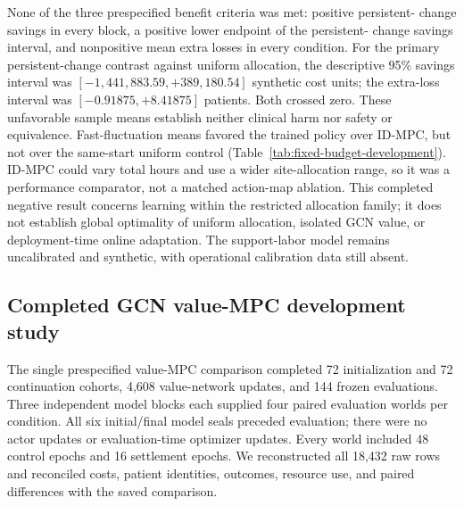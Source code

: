\documentclass[preprint,review,12pt]{elsarticle}
\begin{document}
None of the three prespecified benefit criteria was met: positive persistent-
change savings in every block, a positive lower endpoint of the persistent-
change savings interval, and nonpositive mean extra losses in every condition.
For the primary persistent-change contrast against uniform allocation,
the descriptive 95\% savings interval was
$[-1{,}441{,}883.59,+389{,}180.54]$ synthetic cost units; the extra-loss interval
was $[-0.91875,+8.41875]$ patients. Both crossed zero. These unfavorable sample
means establish neither clinical harm nor safety or equivalence.
Fast-fluctuation means favored the trained policy over ID-MPC, but not over
the same-start uniform control (Table~\ref{tab:fixed-budget-development}).
ID-MPC could vary total hours and use a wider site-allocation range, so it was
a performance comparator, not a matched action-map ablation. This completed
negative result concerns learning within the restricted allocation family;
it does not establish global optimality of uniform allocation, isolated GCN
value, or deployment-time online adaptation. The support-labor model remains
uncalibrated and synthetic, with operational calibration data still absent.

\subsection{Completed GCN value-MPC development study}
\label{sec:value-mpc-development}
The single prespecified value-MPC comparison completed 72 initialization and
72 continuation cohorts, 4,608 value-network updates, and 144 frozen evaluations.
Three independent model blocks each supplied four paired evaluation worlds
per condition. All six initial/final model seals preceded evaluation; there
were no actor updates or evaluation-time optimizer updates. Every world
included 48 control epochs and 16 settlement epochs. We reconstructed all
18,432 raw rows and reconciled costs, patient identities, outcomes, resource
use, and paired differences with the saved comparison.
\end{document}
